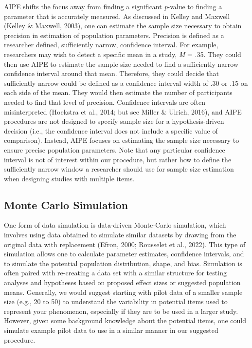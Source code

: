 \documentclass[
  man]{apa7}
\begin{document}
AIPE shifts the focus away from finding a significant \emph{p}-value to finding a parameter that is accurately measured. As discussed in Kelley and Maxwell (Kelley \& Maxwell, 2003), one can estimate the sample size necessary to obtain precision in estimation of population parameters. Precision is defined as a researcher defined, sufficiently narrow, confidence interval. For example, researchers may wish to detect a specific mean in a study, \emph{M} = .35. They could then use AIPE to estimate the sample size needed to find a sufficiently narrow confidence interval around that mean. Therefore, they could decide that sufficiently narrow could be defined as a confidence interval width of .30 or .15 on each side of the mean. They would then estimate the number of participants needed to find that level of precision. Confidence intervals are often misinterpreted (Hoekstra et al., 2014; but see Miller \& Ulrich, 2016), and AIPE procedures are not designed to specify sample size for a hypothesis-driven decision (i.e., the confidence interval does not include a specific value of comparison). Instead, AIPE focuses on estimating the sample size necessary to ensure precise population parameters. Note that any particular confidence interval is not of interest within our procedure, but rather how to define the sufficiently narrow window a researcher should use for sample size estimation when designing studies with multiple items.

\subsection{Monte Carlo Simulation}\label{monte-carlo-simulation}

One form of data simulation is data-driven Monte-Carlo simulation, which involves using data obtained to simulate similar datasets by drawing from the original data with replacement (Efron, 2000; Rousselet et al., 2022). This type of simulation allows one to calculate parameter estimates, confidence intervals, and to simulate the potential population distribution, shape, and bias. Simulation is often paired with re-creating a data set with a similar structure for testing analyses and hypotheses based on proposed effect sizes or suggested population means. Generally, we would suggest starting with pilot data of a smaller sample size (e.g., 20 to 50) to understand the variability in potential items used to represent your phenomenon, especially if they are to be used in a larger study. However, given some background knowledge about the potential items, one could simulate example pilot data to use in a similar manner in our suggested procedure.
\end{document}
